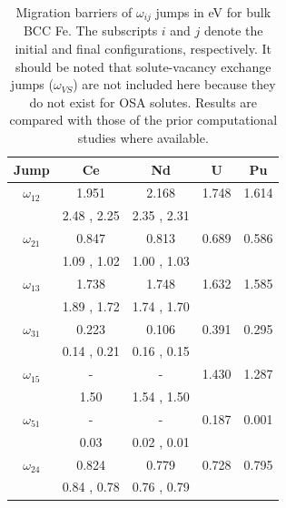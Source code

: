 \documentclass[preprint,12pt]{elsarticle}
\providecommand{\DIFaddbegin}{\protect\color{blue}} %
\providecommand{\DIFdelend}{\protect\color{black}} %
\newcommand{\DIFaddincludegraphics}[2][]{{\color{blue}\fbox{\DIFOincludegraphics[#1]{#2}}}} %
\DeclareRobustCommand{\DIFaddbegin}{\DIFOaddbegin \let\includegraphics\DIFaddincludegraphics} %
\DeclareRobustCommand{\DIFdelend}{\DIFOaddend \let\includegraphics\DIFOincludegraphics} %
\begin{document}
\DIFdelend \DIFaddbegin \begin{table}[!ht]
    \centering
    \caption{Migration barriers of $\omega_{ij}$ jumps in eV for bulk BCC Fe. The subscripts $i$ and $j$ denote the initial and final configurations, respectively. It should be noted that solute-vacancy exchange jumps ($\omega_{VS}$) are not included here because they do not exist for OSA solutes. Results are compared with those of the prior computational studies \cite{yang_significant_2023, ke2025diffusion} where available.}
    \footnotesize \label{tab:migration_barriers}
    \begin{tabular}{|c|c|c|c|c|}
      \hline
      Jump &Ce &Nd &U  &Pu  \\
      \hline
       $\omega_{12}$  &1.951 &2.168 &1.748 &1.614 \\
       &2.48 \cite{yang_significant_2023}, 2.25 \cite{ke2025diffusion}& 2.35 \cite{yang_significant_2023}, 2.31 \cite{ke2025diffusion}&&\\
       \hline
       $\omega_{21}$  &0.847 &0.813 &0.689 &0.586 \\
       &1.09 \cite{yang_significant_2023}, 1.02 \cite{ke2025diffusion}& 1.00 \cite{yang_significant_2023}, 1.03 \cite{ke2025diffusion}&&\\
       \hline
       $\omega_{13}$  &1.738 &1.748 &1.632 &1.585 \\
       &1.89 \cite{yang_significant_2023}, 1.72 \cite{ke2025diffusion}& 1.74 \cite{yang_significant_2023}, 1.70 \cite{ke2025diffusion}&&\\
       \hline
       $\omega_{31}$  &0.223 &0.106 &0.391 &0.295 \\
       &0.14 \cite{yang_significant_2023}, 0.21 \cite{ke2025diffusion}& 0.16 \cite{yang_significant_2023}, 0.15 \cite{ke2025diffusion}&&\\
       \hline
       $\omega_{15}$  &- &- &1.430 &1.287 \\ 
       &1.50 \cite{ke2025diffusion}& 1.54 \cite{yang_significant_2023}, 1.50 \cite{ke2025diffusion}&&\\
       \hline
       $\omega_{51}$  &- &- &0.187 &0.001 \\
       &0.03 \cite{ke2025diffusion}& 0.02 \cite{yang_significant_2023}, 0.01 \cite{ke2025diffusion}&&\\
       \hline
       $\omega_{24}$  &0.824 &0.779 &0.728 &0.795 \\ 
       &0.84 \cite{yang_significant_2023}, 0.78 \cite{ke2025diffusion} & 0.76 \cite{yang_significant_2023}, 0.79 \cite{ke2025diffusion}&&\\

\end{tabular}
\end{table}
\end{document}
